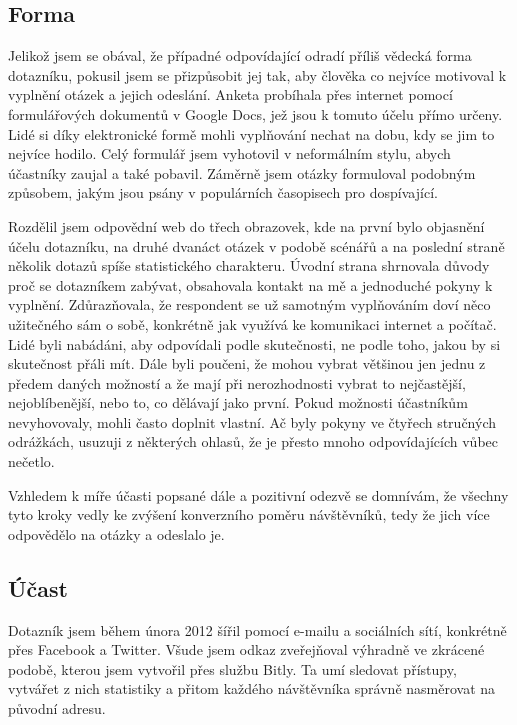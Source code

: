 \documentclass[12pt,oneside,final]{fithesis2}
\begin{document}
\subsection{Forma}
Jelikož jsem se obával, že případné odpovídající odradí příliš vědecká forma dotazníku, pokusil jsem se přizpůsobit jej tak, aby člověka co nejvíce motivoval k vyplnění otázek a jejich odeslání. Anketa probíhala přes internet pomocí formulářových dokumentů v Google Docs, jež jsou k tomuto účelu přímo určeny. Lidé si díky elektronické formě mohli vyplňování nechat na dobu, kdy se jim to nejvíce hodilo. Celý formulář jsem vyhotovil v neformálním stylu, abych účastníky zaujal a také pobavil. Záměrně jsem otázky formuloval podobným způsobem, jakým jsou psány  v populárních časopisech pro dospívající.

Rozdělil jsem odpovědní web do třech obrazovek, kde na první bylo objasnění účelu dotazníku, na druhé dvanáct otázek v podobě scénářů a na poslední straně několik dotazů spíše statistického charakteru. Úvodní strana shrnovala důvody proč se dotazníkem zabývat, obsahovala kontakt na mě a jednoduché pokyny k vyplnění. Zdůrazňovala, že respondent se už samotným vyplňováním doví něco užitečného sám o sobě, konkrétně jak využívá ke komunikaci internet a počítač. Lidé byli nabádáni, aby odpovídali podle skutečnosti, ne podle toho, jakou by si skutečnost přáli mít. Dále byli poučeni, že mohou vybrat většinou jen jednu z předem daných možností a že mají při nerozhodnosti vybrat to nejčastější, nejoblíbenější, nebo to, co dělávají jako první. Pokud možnosti účastníkům nevyhovovaly, mohli často doplnit vlastní. Ač byly pokyny ve čtyřech stručných odrážkách, usuzuji z některých ohlasů, že je přesto mnoho odpovídajících vůbec nečetlo.

Vzhledem k míře účasti popsané dále a pozitivní odezvě se domnívám, že všechny tyto kroky vedly ke zvýšení konverzního poměru návštěvníků, tedy že jich více odpovědělo na otázky a odeslalo je.

\subsection{Účast}\label{attendance}
Dotazník jsem během února 2012 šířil pomocí e-mailu a sociálních sítí, konkrétně přes Facebook a Twitter. Všude jsem odkaz zveřejňoval výhradně ve zkrácené podobě, kterou jsem vytvořil přes službu Bitly. Ta umí sledovat přístupy, vytvářet z nich statistiky a přitom každého návštěvníka správně nasměrovat na původní adresu.
\end{document}
